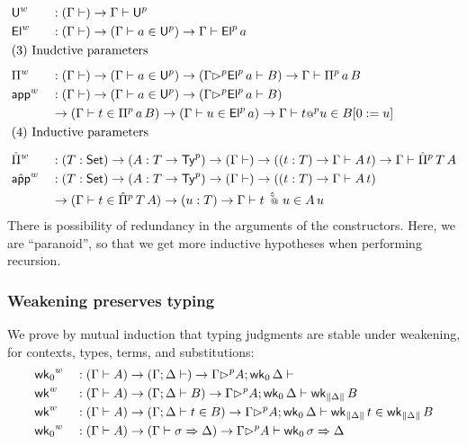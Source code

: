 \begin{alignat*}{5}
  & \Uw && : (\Gamma \vdash)\ra \Gamma \vdash \Uu \\
  & \Elw && : (\Gamma \vdash)\ra (\Gamma \vdash a \in \Uu)\ra\Gamma \vdash \Elu\,a \\
  & \rlap{(3) Inudctive parameters} \\[0.5em]
  & \Piw && :
    (\Gamma \vdash)\ra (\Gamma \vdash a \in \Uu)\ra(\Gamma \extu
  \Elu\,a \vdash B)\ra\Gamma \vdash \Piu \, a \, B \\
  & \appw && :
    (\Gamma \vdash)\ra (\Gamma \vdash a \in \Uu)\ra(\Gamma \extu
    \Elu\,a \vdash B)
    \\
    & &&
    \ra(\Gamma \vdash t \in \Piu \, a \, B )
    \ra
    (\Gamma \vdash u \in \Elu\,a)
    \ra
    \Gamma \vdash t \appu u \in  B [0 := u] \\
  & \rlap{(4) Inductive parameters} \\[0.5em]
  & \Pimw && :
    (T:\Set)\ra(A : T\ra \Tyu)\ra(\Gamma \vdash)\ra
    ((t : T)\ra\Gamma\vdash A\,t) \ra
    \Gamma \vdash \Pimu \,T\,A
    \\
    & \appmw  && :
    (T:\Set)\ra(A : T\ra \Tyu)\ra(\Gamma \vdash)\ra
    ((t : T)\ra\Gamma\vdash A\,t)
    \\
    & &&
    \ra(\Gamma \vdash t \in \Pimu \,T\,A)
    \ra (u : T) \ra \Gamma \vdash t\,\appmu\,u \in A\,u
\end{alignat*}
There is possibility of redundancy in the arguments of the constructors. Here,
we are ``{paranoid}'', so that we get more inductive hypotheses when performing
recursion.


\subsubsection{Weakening preserves typing}
\label{ss:weaken-typing}
We prove by mutual induction that typing judgments are stable under weakening,
for contexts, types, terms, and substitutions:
\begin{alignat*}{5}
  & {\mathsf{wk}_0}^w && : (\Gamma \vdash A)\rightarrow(\Gamma ; \Delta\vdash) \rightarrow
  \Gamma {\rhd}^p A ; \mathsf{wk}_0\, \Delta \vdash \\
  & {\mathsf{wk}}^w && : (\Gamma \vdash A)\rightarrow(\Gamma ; \Delta\vdash B) \rightarrow
  \Gamma {\rhd}^p A ; \mathsf{wk}_0\,\Delta \vdash \mathsf{wk}_{\| \Delta \|}\, B  \\
  & {\mathsf{wk}}^w && : (\Gamma \vdash A)\rightarrow(\Gamma ; \Delta\vdash t\in B) \rightarrow
  \Gamma {\rhd}^p A ; \mathsf{wk}_0\,\Delta \vdash \mathsf{wk}_{\| \Delta \|}\, t \in \mathsf{wk}_{\| \Delta \|}\,B  \\
  & {\mathsf{wk}_0}^w && : (\Gamma \vdash A)\rightarrow(\Gamma \vdash \sigma
  \Rightarrow \Delta) \rightarrow
  \Gamma {\rhd}^p A \vdash \mathsf{wk}_0\, \sigma \Rightarrow \Delta
  \end{alignat*}
